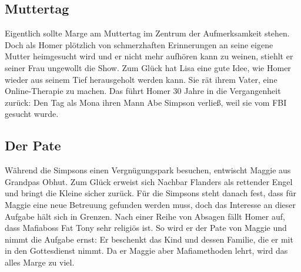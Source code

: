 
\subsection{Muttertag}
Eigentlich sollte Marge am Muttertag im Zentrum der Aufmerksamkeit stehen. Doch als Homer plötzlich von schmerzhaften Erinnerungen an seine eigene Mutter heimgesucht wird und er nicht mehr aufhören kann zu weinen, stiehlt er seiner Frau ungewollt die Show. Zum Glück hat Lisa eine gute Idee, wie Homer wieder aus seinem Tief herausgeholt werden kann. Sie rät ihrem Vater, eine Online-Therapie zu machen. Das führt Homer 30 Jahre in die Vergangenheit zurück: Den Tag als Mona ihren Mann Abe Simpson verließ, weil sie vom FBI gesucht wurde.


\subsection{Der Pate}
Während die Simpsons einen Vergnügungspark besuchen, entwischt Maggie aus Grandpas Obhut. Zum Glück erweist sich Nachbar Flanders als rettender Engel und bringt die Kleine sicher zurück. Für die Simpsons steht danach fest, dass für Maggie eine neue Betreuung gefunden werden muss, doch das Interesse an dieser Aufgabe hält sich in Grenzen. Nach einer Reihe von Absagen fällt Homer auf, dass Mafiaboss Fat Tony sehr religiös ist. So wird er der Pate von Maggie und nimmt die Aufgabe ernst: Er beschenkt das Kind und dessen Familie, die er mit in den Gottesdienst nimmt. Da er Maggie aber Mafiamethoden lehrt, wird das alles Marge zu viel.

